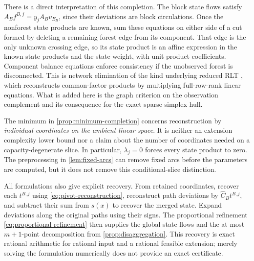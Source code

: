 There is a direct interpretation of this completion. The block state flows
satisfy $A_Bf^{B,j}=y_jA_Bv_{E_B}$, since their deviations are block
circulations. Once the nonforest state products are known, sum these
equations on either side of a cut formed by deleting a remaining forest
edge from its component. That edge is the only
unknown crossing edge, so its state product is an affine expression in the
known state products and the state weight, with unit product coefficients.
Component balance equations enforce consistency if the unobserved forest
is disconnected. This is network elimination of the kind underlying reduced
RLT \citep[Theorem~3.1 and Section~2]{LibertiPantelides2006}, which
reconstructs common-factor products by multiplying full-row-rank linear
equations. What is added here is the graph criterion on the observation
complement and its consequence for the exact sparse simplex hull.

The minimum in \cref{prop:minimum-completion} concerns reconstruction by
\emph{individual coordinates on the ambient linear space}. It is neither
an extension-complexity lower bound nor a claim about the number of
coordinates needed on a capacity-degenerate slice. In particular,
$\lambda_j=0$ forces every state product to zero. The preprocessing in
\cref{lem:fixed-arcs} can remove fixed arcs before the parameters are
computed, but it does not remove this conditional-slice distinction.

All formulations also give explicit recovery. From retained coordinates,
recover each $t^{B,j}$ using \eqref{eq:pivot-reconstruction}, reconstruct
path deviations by $\widehat C_Bt^{B,j}$, and subtract their sum from
$s(x)$ to recover the merged state. Expand deviations along the original
paths using their signs. The proportional refinement
\eqref{eq:proportional-refinement} then supplies the global state flows
and the at-most-$m+1$-point decomposition from
\cref{prop:disaggregation}. This recovery is exact rational arithmetic for
rational input and a rational feasible extension; merely solving the
formulation numerically does not provide an exact certificate.

